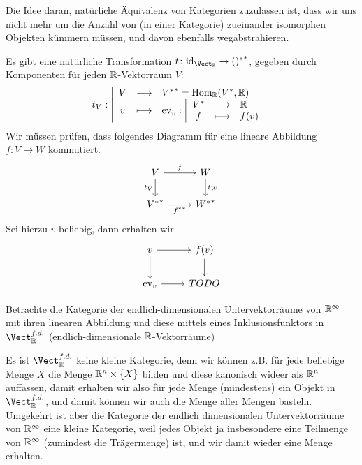 \begin{oral}
    Die Idee daran, natürliche Äquivalenz von Kategorien zuzulassen ist, dass wir uns nicht mehr um die Anzahl von (in einer Kategorie) zueinander isomorphen Objekten kümmern müssen, und davon ebenfalls wegabstrahieren.
\end{oral}

\begin{example}
    Es gibt eine natürliche Transformation $t\colon  \id_{\Vect_{\R}} \to  {()^*}^*$, gegeben durch Komponenten für jeden $\mathbb{R}$-Vektorraum $V$:
        \begin{equation*}
        t_V: \left| \begin{array}{c c l} 
            V & \longrightarrow & {V^*}^* = \operatorname{Hom}_{\mathbb{R}}(V^*,\mathbb{R}) \\
        v & \longmapsto &
            \operatorname{ev}_v: \left| \begin{array}{c c l} 
            V^* & \longrightarrow & \mathbb{R} \\
            f & \longmapsto	 &f(v)
        \end{array} \right.
        \end{array} \right.
    \end{equation*}
    Wir müssen prüfen, dass folgendes Diagramm für eine lineare Abbildung $f\colon  V \to  W$ kommutiert.
    \[
    \begin{tikzcd}
        V \ar[swap]{d}{t_V} \ar{r}{f} & W \ar{d}{t_W}\\
        {V^*}^* \ar[swap]{r}{{f^*}^*} & {W^*}^*
    \end{tikzcd}
    \]
    Sei hierzu $v$ beliebig, dann erhalten wir
     \[
    \begin{tikzcd}
        v \ar[swap]{d}{} \ar{r}{} & f(v) \ar{d}{}\\
        \ev_v \ar[swap]{r}{} & TODO
    \end{tikzcd}
    \]
    
\end{example}

    \begin{example}
        Betrachte die Kategorie der endlich-dimensionalen Untervektorräume von $\mathbb{R}^{\infty}$ mit ihren linearen Abbildung und diese mittels eines Inklusionsfunktors in $\Vect_{\R}^{f.d.}$ (endlich-dimensionale $\mathbb{R}$-Vektorräume)
    \end{example}
    \begin{oral}
        Es ist $\Vect_{\R}^{f.d.}$ keine kleine Kategorie, denn wir können z.B. für jede beliebige Menge $X$ die Menge  $\mathbb{R}^n \times \left \{X\right\} $ bilden und diese kanonisch wideer als $\mathbb{R}^n$ auffassen, damit erhalten wir also für jede Menge (mindestens) ein Objekt in $\Vect_{\R}^{f.d.}$, und damit können wir auch die Menge aller Mengen basteln. \\
        Umgekehrt ist aber die Kategorie der endlich dimensionalen Untervektorräume von $\mathbb{R}^{\infty}$ eine kleine Kategorie, weil jedes Objekt ja insbesondere eine Teilmenge von $\mathbb{R}^{\infty}$ (zumindest die Trägermenge) ist, und wir damit wieder eine Menge erhalten.
    \end{oral}

